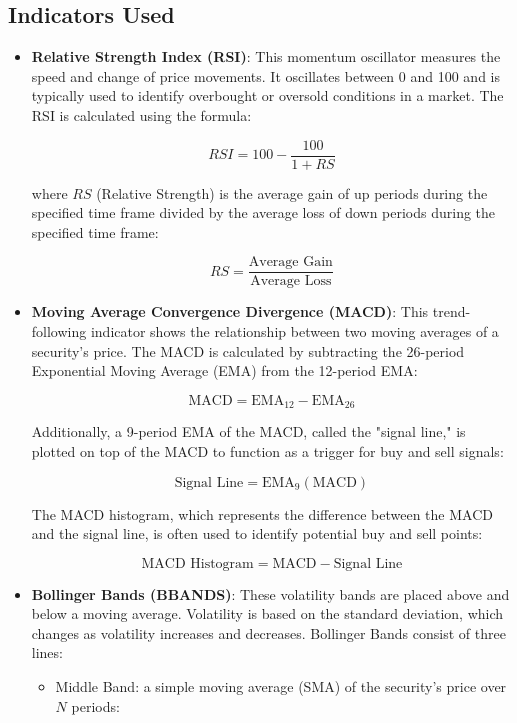 \subsection{Indicators Used}

\begin{itemize}
	\item \textbf{Relative Strength Index (RSI)}: This momentum oscillator measures the speed and change of price movements. It oscillates between 0 and 100 and is typically used to identify overbought or oversold conditions in a market. The RSI is calculated using the formula:

	      \[
		      RSI = 100 - \frac{100}{1 + RS}
	      \]

	      where \( RS \) (Relative Strength) is the average gain of up periods during the specified time frame divided by the average loss of down periods during the specified time frame:

	      \[
		      RS = \frac{\text{Average Gain}}{\text{Average Loss}}
	      \]

	\item \textbf{Moving Average Convergence Divergence (MACD)}: This trend-following indicator shows the relationship between two moving averages of a security's price. The MACD is calculated by subtracting the 26-period Exponential Moving Average (EMA) from the 12-period EMA:

	      \[
		      \text{MACD} = \text{EMA}_{12} - \text{EMA}_{26}
	      \]

	      Additionally, a 9-period EMA of the MACD, called the "signal line," is plotted on top of the MACD to function as a trigger for buy and sell signals:

	      \[
		      \text{Signal Line} = \text{EMA}_{9}(\text{MACD})
	      \]

	      The MACD histogram, which represents the difference between the MACD and the signal line, is often used to identify potential buy and sell points:

	      \[
		      \text{MACD Histogram} = \text{MACD} - \text{Signal Line}
	      \]

	\item \textbf{Bollinger Bands (BBANDS)}: These volatility bands are placed above and below a moving average. Volatility is based on the standard deviation, which changes as volatility increases and decreases. Bollinger Bands consist of three lines:

	      \begin{itemize}
		      \item Middle Band: a simple moving average (SMA) of the security's price over \( N \) periods:


\end{itemize}
\end{itemize}
